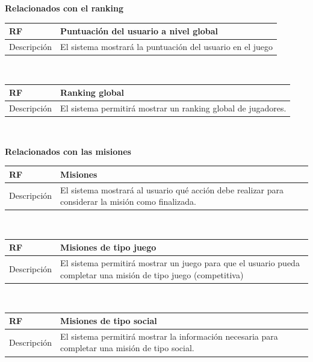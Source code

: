 \documentclass[twoside]{report}
\newcommand\addrow[2]{#1 &#2\\ }
\newcommand\addheading[2]{#1 &#2\\ \hline}
\newcommand\tabularhead{\begin{tabular}{lp{0.7\textwidth}}
\hline
}
\newenvironment{req}{\tabularhead}
{\hline\end{tabular}}
\begin{document}
\vspace{1cm}

\textbf{Relacionados con el ranking}\\

\begin{req}
	\addheading{\textbf{RF\arabic{functionalRequirements}}}{Puntuación del usuario a nivel global}
	\addrow{Descripción}{El sistema mostrará la puntuación del usuario en el juego}
\end{req}\\

\vspace{0.25cm}

\begin{req}
	\addheading{\textbf{RF\arabic{functionalRequirements}}}{Ranking global}
	\addrow{Descripción}{El sistema permitirá mostrar un ranking global de jugadores.}
\end{req}\\

\vspace{1cm}

\textbf{Relacionados con las misiones}\\

\begin{req}
	\addheading{\textbf{RF\arabic{functionalRequirements}}}{Misiones}
	\addrow{Descripción}{El sistema mostrará al usuario qué acción debe realizar para considerar la misión como finalizada.}
\end{req}\\

\vspace{0.25cm}

\begin{req}
	\addheading{\textbf{RF\arabic{functionalRequirements}}}{Misiones de tipo juego}
	\addrow{Descripción}{El sistema permitirá mostrar un juego para que el usuario pueda completar una misión de tipo juego (competitiva)}
\end{req}\\

\vspace{0.25cm}

\begin{req}
	\addheading{\textbf{RF\arabic{functionalRequirements}}}{Misiones de tipo social}
	\addrow{Descripción}{El sistema permitirá mostrar la información necesaria para completar una misión de tipo social.}
\end{req}\\
\end{document}
